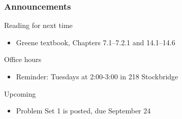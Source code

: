 \documentclass{beamer}\usepackage[]{graphicx}\usepackage[]{color}
\begin{document}
\begin{frame}\frametitle{Announcements}
    Reading for next time
    \begin{itemize}
        \item Greene textbook, Chapters 7.1--7.2.1 and 14.1--14.6
    \end{itemize}
    \vspace{3ex}
    Office hours
    \begin{itemize}
    	\item Reminder: Tuesdays at 2:00-3:00 in 218 Stockbridge
    \end{itemize}
    \vspace{3ex}
    Upcoming
    \begin{itemize}
        \item Problem Set 1 is posted, due September 24
    \end{itemize}
\end{frame}
\end{document}
